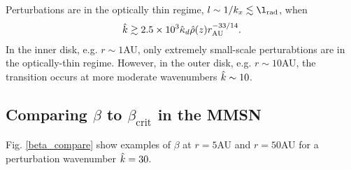 Perturbations are in the optically thin regime,
$l\sim 1/k_x \lesssim\l_\mathrm{rad}$, when 
\begin{align}
  \hat{k}\gtrsim 2.5\times10^3\hat{\kappa}_d\hat{\rho}(z)r_\mathrm{AU}^{-33/14}.  
\end{align}
In the inner disk, e.g. $r\sim 1$AU, only
extremely small-scale perturabtions are in the optically-thin
regime. However, in the outer disk, e.g. $r\sim 10$AU, the transition
occurs at more moderate wavenumbers $\hat{k}\sim 10$.


\subsection{Comparing $\beta$ to $\beta_\mathrm{crit}$ in the MMSN} 


Fig. \ref{beta_compare} show examples of
$\beta$ at $r=5$AU and $r=50$AU for a perturbation wavenumber
$\hat{k}=30$. 
 







